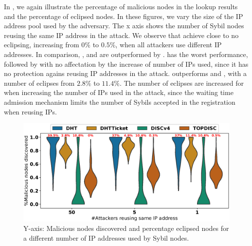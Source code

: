 In ,  we again illustrate the percentage of malicious nodes in the lookup results and the percentage of eclipsed nodes.
In these figures, we vary the size of the IP address pool used by the adversary. 
The x axis shows the number of Sybil nodes reusing the same IP address in the attack.
We observe that  \sysname achieve close to no eclipsing,  increasing from $0\%$ to $0.5\%$, when all attackers use different IP addresses.
In comparison, \discv, \altname and \altnameticket are outperformed by \sysname.
\altname has the worst performance,  followed by \discv with no affectation by the increase of number of IPs used,  since it has no protection agains reusing IP addresses in the attack.
\altnameticket outperforms \discv and \altname, with a number of eclipses from $2.8\%$ to $11.4\%$. 
The number of eclipses are increased for \altnameticket when increasing the number of IPs used in the attack,  since the waiting time admission mechanism limits the number of Sybils accepted in the registration when reusing IPs.

\begin{figure}[!h]
\includegraphics[width=\linewidth]{results/security/violin_sybilSize_percentageMaliciousDiscovered_t10.eps}
\caption{Y-axis: Malicious nodes discovered and percentage eclipsed nodes for a different number of IP addresses used by Sybil nodes.}
\label{fig:eclipse_sybil}
\end{figure}

%
%
%








